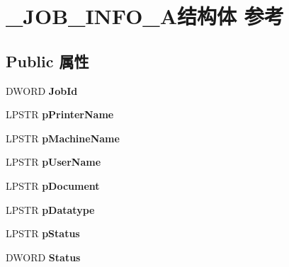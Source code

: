 \hypertarget{struct___j_o_b___i_n_f_o__1_a}{}\section{\+\_\+\+J\+O\+B\+\_\+\+I\+N\+F\+O\+\_\+A结构体 参考}
\label{struct___j_o_b___i_n_f_o__1_a}
\subsection*{Public 属性}
\begin{DoxyCompactItemize}
\item 
\mbox{\label{struct___j_o_b___i_n_f_o__1_a_a23b7c2123ef7e9b09174761cff561b3f}} 
D\+W\+O\+RD {\bfseries Job\+Id}
\item 
\mbox{\label{struct___j_o_b___i_n_f_o__1_a_a1d85792c6ba453d15f6802d8e8adf4a7}} 
L\+P\+S\+TR {\bfseries p\+Printer\+Name}
\item 
\mbox{\label{struct___j_o_b___i_n_f_o__1_a_a36f55b9a19e126fd532d9a64581d8878}} 
L\+P\+S\+TR {\bfseries p\+Machine\+Name}
\item 
\mbox{\label{struct___j_o_b___i_n_f_o__1_a_ac222d12c85a67e252535f2ab0e88c70e}} 
L\+P\+S\+TR {\bfseries p\+User\+Name}
\item 
\mbox{\label{struct___j_o_b___i_n_f_o__1_a_a52da9c4f1e650c44ad9ef43d34c0742f}} 
L\+P\+S\+TR {\bfseries p\+Document}
\item 
\mbox{\label{struct___j_o_b___i_n_f_o__1_a_a1fb235c90b873d4fe3c894873d00c06a}} 
L\+P\+S\+TR {\bfseries p\+Datatype}
\item 
\mbox{\label{struct___j_o_b___i_n_f_o__1_a_af66161fe5e0621828aeaaac95f3b0306}} 
L\+P\+S\+TR {\bfseries p\+Status}
\item 
\mbox{\label{struct___j_o_b___i_n_f_o__1_a_a8bfeb335c346a065d3131e0ffc1a8f17}} 
D\+W\+O\+RD {\bfseries Status}
\item 

\end{DoxyCompactItemize}
